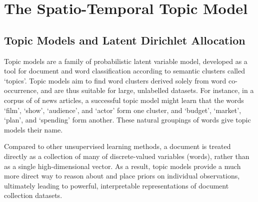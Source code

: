 
\chapter{The Spatio-Temporal Topic Model} \label{ch:topic-models-detail}

\section{Topic Models and Latent Dirichlet Allocation}


Topic models are a family of probabilistic latent variable model, developed as a tool for document and word classification according to semantic clusters called `topics'. Topic models aim to find word clusters derived solely from word co-occurrence, and are thus suitable for large, unlabelled datasets. For instance, in a corpus of of news articles, a successful topic model might learn that the words `film', `show', `audience', and `actor' form one cluster, and `budget', `market', `plan', and `spending' form another. These natural groupings of words give topic models their name.

Compared to other unsupervised learning methods, a document is treated directly as a collection of many of discrete-valued variables (words), rather than as a single high-dimensional vector. As a result, topic models provide a much more direct way to reason about and place priors on individual observations, ultimately leading to powerful, interpretable representations of document collection datasets.


